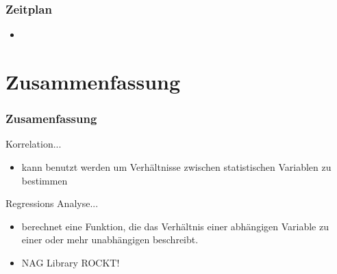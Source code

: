\documentclass{beamer}
\begin{document}
\begin{frame}
 \frametitle{Zeitplan}	

 \begin{table}[]
  
 \end{table}

 \begin{itemize}
  \item 
 \end{itemize}

\end{frame}


\section{Zusammenfassung}

\begin{frame}
 \frametitle{Zusamenfassung}
 
 \begin{block}{Korrelation...}
  \begin{itemize}
   \item kann benutzt werden um Verh\"altnisse zwischen statistischen Variablen zu bestimmen
  \end{itemize}
 \end{block}

 \begin{block}{Regressions Analyse...}
  \begin{itemize}
   \item berechnet eine Funktion, die das Verh\"altnis einer abh\"angigen Variable zu einer oder mehr unabh\"angigen beschreibt.
  \end{itemize}
 \end{block}

 \begin{itemize}
  \item NAG Library ROCKT!
 \end{itemize}

\end{frame}
\end{document}
